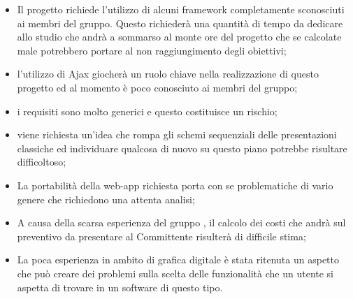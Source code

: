 \begin{itemize}
	\item Il progetto \PROGETTO richiede l'utilizzo di alcuni framework completamente sconosciuti ai membri del gruppo. Questo richiederà una quantità di tempo da dedicare allo studio che andrà a sommarso al monte ore del progetto che se calcolate male potrebbero portare al non raggiungimento degli obiettivi;
	\item l'utilizzo di Ajax giocherà un ruolo chiave nella realizzazione di questo progetto ed al momento è poco conosciuto ai membri del gruppo;
	\item i requisiti sono molto generici e questo costituisce un rischio;
	\item viene richiesta un’idea che rompa gli schemi sequenziali delle presentazioni classiche ed individuare qualcosa di nuovo su questo piano potrebbe risultare difficoltoso;
	\item La portabilità della web-app richiesta porta con se problematiche di vario genere che richiedono una attenta analisi;
	\item A causa della scarsa esperienza del gruppo \GRUPPO, il calcolo dei costi che andrà sul preventivo da presentare al Committente risulterà di difficile stima;
	\item La poca esperienza in ambito di grafica digitale è stata ritenuta un aspetto che può creare dei problemi sulla scelta delle funzionalità che un utente si aspetta di trovare in un software di questo tipo.
\end{itemize}
